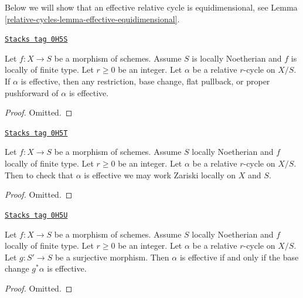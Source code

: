 Below we will show that an effective relative cycle is equidimensional,
see Lemma \ref{relative-cycles-lemma-effective-equidimensional}.

\begin{lemma}
\label{relative-cycles-lemma-effective-functoriality}
\href{https://stacks.math.columbia.edu/tag/0H5S}{\texttt{Stacks tag 0H5S}}

Let $f : X \to S$ be a morphism of schemes. Assume $S$ is locally Noetherian
and $f$ is locally of finite type. Let $r \geq 0$ be an integer. Let
$\alpha$ be a relative $r$-cycle on $X/S$. If $\alpha$ is effective,
then any restriction, base change, flat pullback, or proper pushforward
of $\alpha$ is effective.
\end{lemma}

\begin{proof}
Omitted.
\end{proof}

\begin{lemma}
\label{relative-cycles-lemma-check-effective}
\href{https://stacks.math.columbia.edu/tag/0H5T}{\texttt{Stacks tag 0H5T}}

Let $f : X \to S$ be a morphism of schemes. Assume $S$ locally Noetherian
and $f$ locally of finite type. Let $r \geq 0$ be an integer. Let $\alpha$
be a relative $r$-cycle on $X/S$. Then to check that $\alpha$ is effective
we may work Zariski locally on $X$ and $S$.
\end{lemma}

\begin{proof}
Omitted.
\end{proof}

\begin{lemma}
\label{relative-cycles-lemma-effective-descent}
\href{https://stacks.math.columbia.edu/tag/0H5U}{\texttt{Stacks tag 0H5U}}

Let $f : X \to S$ be a morphism of schemes. Assume $S$ locally Noetherian
and $f$ locally of finite type. Let $r \geq 0$ be an integer. Let $\alpha$
be a relative $r$-cycle on $X/S$. Let $g : S' \to S$ be a surjective morphism.
Then $\alpha$ is effective if and only if the base change $g^*\alpha$
is effective.
\end{lemma}

\begin{proof}
Omitted.
\end{proof}

